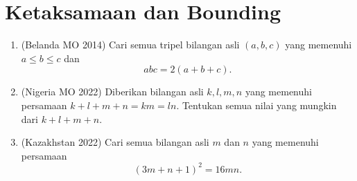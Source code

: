 \documentclass[12pt]{scrartcl}
\begin{document}
\section{Ketaksamaan dan Bounding}
\begin{enumerate}[resume]

	\item (Belanda MO 2014)
	Cari semua tripel bilangan asli $(a, b, c)$ yang memenuhi $a \le b \le c$ dan
	\[ abc = 2(a + b + c). \]

	\item (Nigeria MO 2022)
	Diberikan bilangan asli $k, l, m, n$ yang memenuhi persamaan $k + l + m + n = km = ln$.
	Tentukan semua nilai yang mungkin dari $k + l + m + n$.

	\item (Kazakhstan 2022)
	Cari semua bilangan asli $m$ dan $n$ yang memenuhi persamaan
	\[ (3m + n + 1)^2 = 16mn. \]

\end{enumerate}
\end{document}
